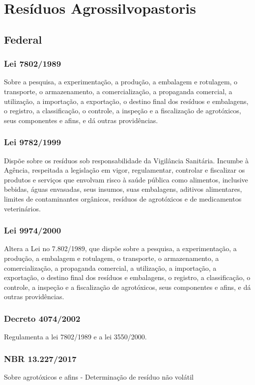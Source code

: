  
\section{Resíduos Agrossilvopastoris}
\begin{subapend}
	\subsection{Federal}
	\begin{subsubapend}
		\subsubsection{Lei 7802/1989}
		Sobre a pesquisa, a experimentação, a produção, a embalagem e rotulagem, o transporte, o armazenamento, a comercialização, a propaganda comercial, a utilização, a importação, a exportação, o destino final dos resíduos e embalagens, o registro, a classificação, o controle, a inspeção e a fiscalização de agrotóxicos, seus componentes e afins, e dá outras providências.
		\subsubsection{Lei 9782/1999}
		Dispõe sobre os resíduos sob responsabilidade da Vigilância Sanitária. Incumbe à Agência, respeitada a legislação em vigor, regulamentar, controlar e fiscalizar os produtos e serviços que envolvam risco à saúde pública como alimentos, inclusive bebidas, águas envasadas, seus insumos, suas embalagens, aditivos alimentares, limites de contaminantes orgânicos, resíduos de agrotóxicos e de medicamentos veterinários.
		\subsubsection{Lei 9974/2000}
		Altera a Lei no 7.802/1989, que dispõe sobre a pesquisa, a experimentação, a produção, a embalagem e rotulagem, o transporte, o armazenamento, a comercialização, a propaganda comercial, a utilização, a importação, a exportação, o destino final dos resíduos e embalagens, o registro, a classificação, o controle, a inspeção e a fiscalização de agrotóxicos, seus componentes e afins, e dá outras providências.
		\subsubsection{Decreto 4074/2002}
		Regulamenta a lei 7802/1989 e a lei 3550/2000.
		\subsubsection{NBR 13.227/2017}
		Sobre agrotóxicos e afins - Determinação de resíduo não volátil

\end{subsubapend}
\end{subapend}

